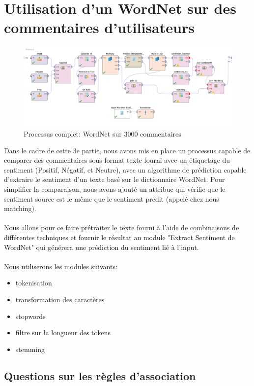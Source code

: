 \documentclass[a4paper]{article}
\begin{document}
\pagebreak
\section{Utilisation d'un WordNet sur des commentaires d’utilisateurs}

\begin{figure}[H]
	\includegraphics[width=\linewidth]{imgs/part_3/3_full_process}
	\caption{Processus complet: WordNet sur 3000 commentaires }
	\label{fig:3_full_process}
\end{figure}

Dans le cadre de cette 3e partie, nous avons mis en place un processus capable de comparer des commentaires sous format texte fourni avec un étiquetage du sentiment (Positif, Négatif, et Neutre), avec un algorithme de prédiction capable d'extraire le sentiment d'un texte basé sur le dictionnaire WordNet. Pour simplifier la comparaison, nous avons ajouté un attribue qui vérifie que le sentiment source est le même que le sentiment prédit (appelé chez nous matching).
\\\\
Nous allons pour ce faire prétraiter le texte fourni à l'aide de combinaisons de différentes techniques et fournir le résultat au module "Extract Sentiment de WordNet" qui générera une prédiction du sentiment lié à l'input.
\\\\
Nous utiliserons les modules suivants:
\begin{itemize}
	\item tokenisation
	\item transformation des caractères
	\item stopwords
	\item filtre sur la longueur des tokens
	\item stemming
\end{itemize}

\subsection{Questions sur les règles d'association}
\end{document}
